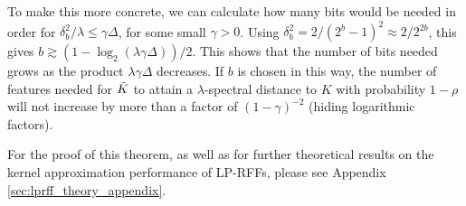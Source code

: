 To make this more concrete, we can calculate how many bits would be needed in order for $\delta^2_b/\lambda \leq \gamma\Delta$, for some small $\gamma > 0$. Using $\delta_b^2 = 2/(2^b-1)^2 \approx 2/2^{2b}$, this gives $b \gtrsim (1-\log_2(\lambda \gamma \Delta))/2$.  This shows that the number of bits needed grows as the product $\lambda \gamma \Delta$ decreases.  If $b$ is chosen in this way, the number of features needed for $\tilde{K}$ to attain a $\lambda$-spectral distance to $K$ with probability $1-\rho$ will not increase by more than a factor of $(1-\gamma)^{-2}$ (hiding logarithmic factors). 


For the proof of this theorem, as well as for further theoretical results on the kernel approximation performance of LP-RFFs, please see Appendix \ref{sec:lprff_theory_appendix}.